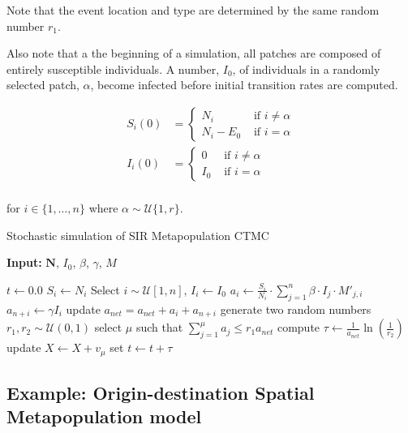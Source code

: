 \documentclass[
  letterpaper,
  DIV=11,
  numbers=noendperiod]{scrartcl}
\begin{document}
Note that the event location and type are determined by the same random
number \(r_1\).

Also note that a the beginning of a simulation, all patches are composed
of entirely susceptible individuals. A number, \(I_0\), of individuals
in a randomly selected patch, \(\alpha\), become infected before initial
transition rates are computed.

\[
\begin{aligned}
S_i(0) & = \begin{cases}N_i & \text { if } i \neq \alpha \\
N_i-E_0 & \text { if } i=\alpha\end{cases} \\
I_i(0) & = \begin{cases}0 & \text { if } i \neq \alpha \\
I_0 & \text { if }  i=\alpha\end{cases} \\
\end{aligned}
\]

for \(i \in \{1, \ldots, n\}\) where
\(\alpha \sim \mathcal{U}\{1, r\}\).

\begin{algorithm}[htb!]
\caption{Stochastic simulation of SIR Metapopulation CTMC}
\textbf{Input:} $\mathbf{N}$, $I_0$, $\beta$, $\gamma$, $M$
\label{alg-SIR_Metapopulation_Gillespie}
\begin{algorithmic}[1]
\State $t \gets 0.0$  
 
\State $S_{i} \gets N_{i}$
\EndFor
\State Select $i \sim \mathcal{U}[1,n]$,  $I_{i} \gets I_0$                               
\State $a_{i} \gets \frac{S_{i}}{N_{i}} \cdot \sum\limits_{j = 1}^{n} \beta \cdot I_j \cdot M'_{j,i}$
\State $a_{n+i} \gets \gamma I_{i}$
\State update $a_{net} = a_{net} + a_i + a_{n+i}$
\EndFor
\State generate two random numbers $r_1, r_2 \sim \mathcal{U}(0,1)$
\State select $\mu$ such that $\sum\limits_{j = 1}^{\mu} a_j \leq r_1 a_{net}$
\State compute $\tau \gets \frac{1}{a_{net}}\ln(\frac{1}{r_2})$
\State update $X \gets X + v_\mu$
\State set $t \gets t + \tau$
\EndWhile
\end{algorithmic}
\end{algorithm}

\hypertarget{example-origin-destination-spatial-metapopulation-model}{%
\subsection{Example: Origin-destination Spatial Metapopulation
model}\label{example-origin-destination-spatial-metapopulation-model}}
\end{document}
